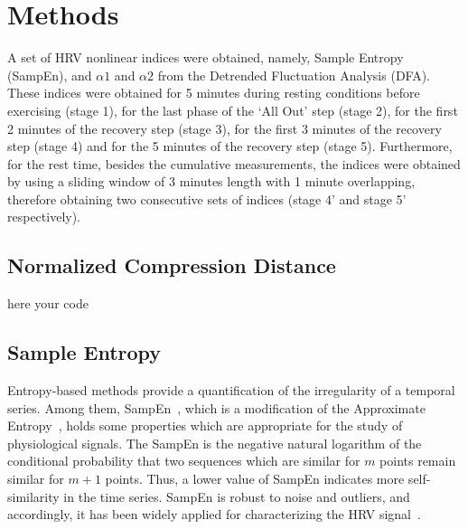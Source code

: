 \section{Methods}

A set of HRV nonlinear indices were obtained, namely, Sample Entropy (SampEn), and $\alpha1$ and $\alpha2$ from the Detrended Fluctuation Analysis (DFA).  These indices were obtained for 5 minutes during resting conditions before exercising (stage 1), for the last phase of the `All Out' step (stage 2), for the first 2 minutes of the recovery step (stage 3), for the first 3 minutes of the recovery step (stage 4) and for the 5 minutes of the recovery step (stage 5). Furthermore, for the rest time, besides the cumulative measurements, the indices were obtained by using a sliding window of 3 minutes length with 1 minute overlapping, therefore obtaining two consecutive sets of indices (stage 4' and stage 5' respectively).

\subsection{Normalized Compression Distance}
here your code

\subsection{Sample Entropy}
Entropy-based methods provide a quantification of the irregularity of a temporal series. Among them, SampEn~\cite{richman00}, which is a modification of the Approximate Entropy~\cite{pincus91}, holds some properties which are appropriate for the study of physiological signals. The SampEn is the negative natural logarithm of the conditional probability that two sequences which are similar for $m$ points remain similar for $m+1$ points. Thus, a lower value of SampEn indicates more self-similarity in the time series. SampEn is robust to noise and outliers, and accordingly, it has been widely applied for characterizing the HRV signal~\cite{richman00}.

